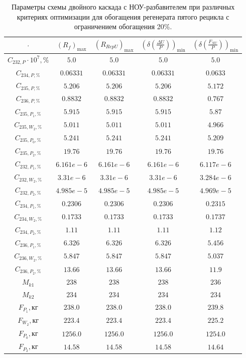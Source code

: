 \begin{table}
    \centering
    \begin{tabular}{|c|cccc|}
        \hline $\cdot$ & $(R_f)_\text{max}$ & $(R_{RepU})_\text{max}$ & $(\delta(\frac{\Delta U}{P}))_\text{min}$ & $(\delta(\frac{F_{NU}}{P}))_\text{min}$\\ \hline
        $C_{232,P}\cdot10^{7}, \%$ & $5.0$ & $5.0$ & $5.0$ & $5.0$\\ \hline
        $C_{234,P, \%}$ & $0.06331$ & $0.06331$ & $0.06331$ & $0.0633$\\ \hline
        $C_{235,P, \%}$ & $5.206$ & $5.206$ & $5.206$ & $5.172$\\ \hline
        $C_{236,P, \%}$ & $0.8832$ & $0.8832$ & $0.8832$ & $0.767$\\ \hline
        $C_{235,P_1, \%}$ & $5.915$ & $5.915$ & $5.915$ & $5.87$\\ \hline
        $C_{235,W_2, \%}$ & $5.011$ & $5.011$ & $5.011$ & $4.966$\\ \hline
        $C_{235,P_0, \%}$ & $5.241$ & $5.241$ & $5.241$ & $5.209$\\ \hline
        $C_{235,P_2, \%}$ & $19.76$ & $19.76$ & $19.76$ & $19.76$\\ \hline
        $C_{232,P_1, \%}$ & $6.161e-6$ & $6.161e-6$ & $6.161e-6$ & $6.117e-6$\\ \hline
        $C_{232,W_2, \%}$ & $3.31e-6$ & $3.31e-6$ & $3.31e-6$ & $3.284e-6$\\ \hline
        $C_{232,P_2, \%}$ & $4.985e-5$ & $4.985e-5$ & $4.985e-5$ & $4.969e-5$\\ \hline
        $C_{234,P_1, \%}$ & $0.2306$ & $0.2306$ & $0.2306$ & $0.2315$\\ \hline
        $C_{234,W_2, \%}$ & $0.1733$ & $0.1733$ & $0.1733$ & $0.1737$\\ \hline
        $C_{234,P_2, \%}$ & $1.11$ & $1.11$ & $1.11$ & $1.12$\\ \hline
        $C_{236,P_1, \%}$ & $6.326$ & $6.326$ & $6.326$ & $5.456$\\ \hline
        $C_{236,W_2, \%}$ & $5.847$ & $5.847$ & $5.847$ & $5.037$\\ \hline
        $C_{236,P_2, \%}$ & $13.66$ & $13.66$ & $13.66$ & $11.9$\\ \hline
        $M_{k1}$ & $238$ & $238$ & $238$ & $236$\\ \hline
        $M_{k2}$ & $234$ & $234$ & $234$ & $234$\\ \hline
        $F_{P_1}, \text{кг}$ & $238.0$ & $238.0$ & $238.0$ & $239.8$\\ \hline
        $F_{W_2}, \text{кг}$ & $223.4$ & $223.4$ & $223.4$ & $225.2$\\ \hline
        $F_{P_0}, \text{кг}$ & $1256.0$ & $1256.0$ & $1256.0$ & $1254.0$\\ \hline
        $F_{P_2}, \text{кг}$ & $14.58$ & $14.58$ & $14.58$ & $14.64$\\ \hline
    \end{tabular}
    \caption{Параметры схемы двойного каскада с НОУ-разбавителем при различных критериях оптимизации для обогащения регенерата пятого рецикла с ограничением обогащения 20\%.{\label{2opt5_20}}}
\end{table}


